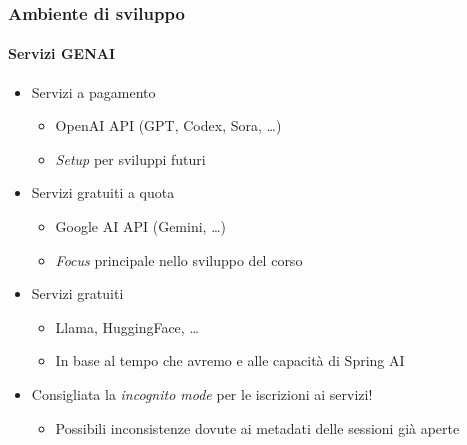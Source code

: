\begin{frame}[t,fragile] \frametitle{Ambiente di sviluppo}
\framesubtitle{Servizi GENAI}
    \begin{itemize}
        \item[\alertedcircled{1}] Servizi a pagamento
        \begin{itemize}[leftmargin=20pt,align=right]
			\item[\alert{\faArrowCircleRight}] OpenAI API (GPT, Codex, Sora, \ldots)
			\item[\alert{\faExclamationTriangle}] \textit{Setup} per sviluppi futuri 
        \end{itemize}
        \item[\alertedcircled{2}] Servizi gratuiti a quota
        \begin{itemize}[leftmargin=20pt,align=right]
			\item[\alert{\faArrowCircleRight}] Google AI API (Gemini, \ldots)
			\item[\alert{\faExclamationTriangle}] \textit{Focus} principale nello sviluppo del corso 
        \end{itemize}
        \item[\alertedcircled{3}] Servizi gratuiti
        \begin{itemize}[leftmargin=20pt,align=right]
			\item[\alert{\faArrowCircleRight}] Llama, HuggingFace, \ldots
			\item[\alert{\faExclamationTriangle}] In base al tempo che avremo e alle capacità di Spring AI
        \end{itemize}        
    \end{itemize}
    \vfill
    \begin{itemize}
        \item[\alert{\faExclamationTriangle}] Consigliata la \textit{incognito mode} per le iscrizioni ai servizi!
        \begin{itemize}[leftmargin=20pt,align=right]
			\item[\alert{\faArrowCircleRight}] Possibili inconsistenze dovute ai metadati delle sessioni già aperte
        \end{itemize} 
    \end{itemize}
\end{frame}
%
